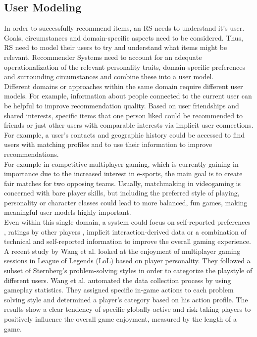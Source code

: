 \documentclass[conference]{IEEEtran}
\begin{document}
\subsection{User Modeling} \label{rw:usermodeling}
In order to successfully recommend items, an RS needs to understand it's user. Goals, circumstances and domain-specific aspects need to be considered. Thus, RS need to model their users to try and understand what items might be relevant. Recommender Systems need to account for an adequate operationalization of the relevant personality traits, domain-specific preferences and surrounding circumstances and combine these into a user model.\\
Different domains or approaches within the same domain require different user models. For example, information about people connected to the current user can be helpful to improve recommendation quality. Based on user friendships and shared interests, specific items that one person liked could be recommended to friends \cite{feng2013recommendation} or just other users with comparable interests via implicit user connections. \cite{8328917} For example, a user's contacts and geographic history could be accessed to find users with matching profiles and to use their information to improve recommendations. \cite{ramaswamy2009caesar}\\ 
For example in competitive multiplayer gaming, which is currently gaining in importance due to the increased interest in e-sports, the main goal is to create fair matches for two opposing teams. Usually, matchmaking in videogaming is concerned with bare player skills, but including the preferred style of playing, personality or character classes could lead to more balanced, fun games, making meaningful user models highly important.\\
Even within this single domain, a system could focus on self-reported preferences \cite{riegelsberger2007personality}, ratings by other players \cite{patrick2011system}, implicit interaction-derived data \cite{suznjevic2015application, delalleau2012beyond} or a combination of technical and self-reported information to improve the overall gaming experience. \cite{farnham2009method}\\
A recent study by Wang et al. \cite{wang2015thinking} looked at the enjoyment of multiplayer gaming sessions in League of Legends (LoL) based on player personality. They followed a subset of Sternberg's \cite{sternberg1999thinking} problem-solving styles in order to categorize the playstyle of different users. Wang et al. automated the data collection process by using gameplay statistics. They assigned specific in-game actions to each problem solving style and determined a player's category based on his action profile. The results show a clear tendency of specific globally-active and risk-taking players to positively influence the overall game enjoyment, measured by the length of a game.\\
\end{document}
